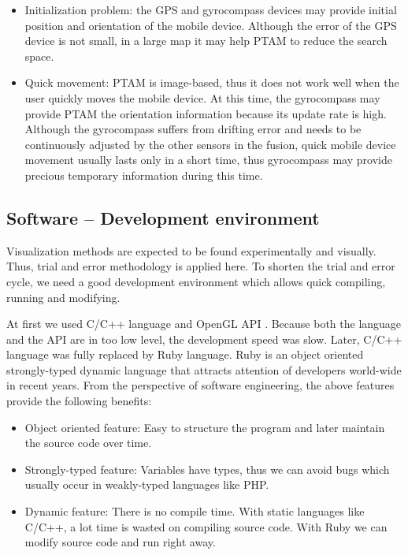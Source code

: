 \begin{itemize}
	\item Initialization problem: the GPS and gyrocompass devices may provide initial position and orientation of the mobile device. Although the error of the GPS device is not small, in a large map it may help PTAM to reduce the search space.
	\item Quick movement: PTAM is image-based, thus it does not work well when the user quickly moves the mobile device. At this time, the gyrocompass may provide PTAM the orientation information because its update rate is high. Although the gyrocompass suffers from drifting error and needs to be continuously adjusted by the other sensors in the fusion, quick mobile device movement usually lasts only in a short time, thus gyrocompass may provide precious temporary information during this time.
\end{itemize}

\subsection{Software -- Development environment}

Visualization methods are expected to be found experimentally and visually. Thus, trial and error methodology is applied here. To shorten the trial and error cycle, we need a good development environment which allows quick compiling, running and modifying.

At first we used C/C++ language and OpenGL API \cite{Reference10}. Because both the language and the API are in too low level, the development speed was slow. Later, C/C++ language was fully replaced by Ruby language. Ruby is an object oriented strongly-typed dynamic language that attracts attention of developers world-wide in recent years. From the perspective of software engineering, the above features provide the following benefits:

\begin{itemize}
	\item Object oriented feature: Easy to structure the program and later maintain the source code over time.
	\item Strongly-typed feature: Variables have types, thus we can avoid bugs which usually occur in weakly-typed languages like PHP.
	\item Dynamic feature: There is no compile time. With static languages like C/C++, a lot time is wasted on compiling source code. With Ruby we can modify source code and run right away.
\end{itemize}

